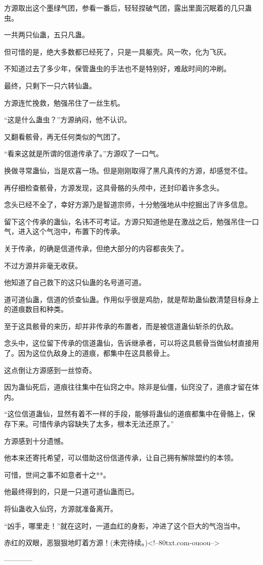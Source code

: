 \begin{this_body}
方源取出这个墨绿气团，参看一番后，轻轻捏破气团，露出里面沉眠着的几只蛊虫。

一共两只仙蛊，五只凡蛊。

但可惜的是，绝大多数都已经死了，只是一具躯壳。风一吹，化为飞灰。

不知道过去了多少年，保管蛊虫的手法也不是特别好，难敌时间的冲刷。

最终，只剩下一只六转仙蛊。

方源连忙挽救，勉强吊住了一丝生机。

“这是什么蛊虫？”方源纳闷，他不认识。

又翻看骸骨，再无任何类似的气团了。

“看来这就是所谓的信道传承了。”方源叹了一口气。

换做寻常蛊仙，当是欢喜一场。但是刚刚取得了黑凡真传的方源，却感觉不佳。

再仔细检查骸骨，方源发现，这具骨骼的头颅中，还封印着许多念头。

念头已经不全了，幸好方源乃是智道宗师，十分勉强地从中挖掘出了许多信息。

留下这个传承的蛊仙，名讳不可考证。方源只知道他是在激战之后，勉强吊住一口气，进入这个气泡中，布置下的传承。

关于传承，的确是信道传承，但绝大部分的内容都丧失了。

不过方源并非毫无收获。

他知道了自己救下的这只仙蛊的名号道可道。

道可道仙蛊，信道的侦查仙蛊。作用似乎很是鸡肋，就是帮助蛊仙数清楚目标身上的道痕数目和种类。

至于这具骸骨的来历，却并非传承的布置者，而是被信道蛊仙斩杀的仇敌。

念头中，这位留下传承的信道蛊仙，告诉继承者，可以将这具骸骨当做仙材直接用了。因为这位仇敌身上的道痕，都集中在这具骸骨上。

这点倒让方源感到一丝惊奇。

因为蛊仙死后，道痕往往集中在仙窍之中。除非是仙僵，仙窍没了，道痕才留在体内。

“这位信道蛊仙，显然有着不一样的手段，能够将蛊仙的道痕都集中在骨骼上，保存下来。可惜传承内容缺失了太多，根本无法还原了。”

方源感到十分遗憾。

他本来还寄托希望，可以借助这份信道传承，让自己拥有解除盟约的本领。

可惜，世间之事不如意者十之**。

他最终得到的，只是一只道可道仙蛊而已。

将仙蛊收入仙窍，方源就准备离开。

“凶手，哪里走！”就在这时，一道血红的身影，冲进了这个巨大的气泡当中。

赤红的双眼，恶狠狠地盯着方源！(未完待续。)<!--80txt.com-ouoou-->

------------

\end{this_body}

